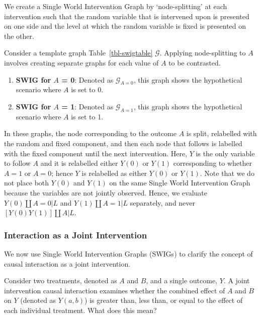 \documentclass[
  single column]{article}
\providecommand{\tightlist}{%
  \setlength{\itemsep}{0pt}\setlength{\parskip}{0pt}}\usepackage{longtable,booktabs,array}
\begin{document}
We create a Single World Intervention Graph by `node-splitting' at each
intervention such that the random variable that is intervened upon is
presented on one side and the level at which the random variable is
fixed is presented on the other.

Consider a template graph Table~\ref{tbl-swigtable} \(\mathcal{G}\).
Applying node-splitting to \(A\) involves creating separate graphs for
each value of \(A\) to be contrasted.

\begin{enumerate}
\def\labelenumi{\arabic{enumi}.}
\tightlist
\item
  \textbf{SWIG for \(A\) = 0}: Denoted as \(\mathcal{G}_{A=0}\), this
  graph shows the hypothetical scenario where \(A\) is set to 0.
\item
  \textbf{SWIG for \(A\) = 1}: Denoted as \(\mathcal{G}_{A=1}\), this
  graph shows the hypothetical scenario where \(A\) is set to 1.
\end{enumerate}

In these graphs, the node corresponding to the outcome \(A\) is split,
relabelled with the random and fixed component, and then each node that
follows is labelled with the fixed component until the next
intervention. Here, \(Y\) is the only variable to follow \(A\) and it is
relabelled either \(Y(0)\) or \(Y(1)\) corresponding to whether \(A=1\)
or \(A=0\); hence \(Y\) is relabelled as either \(Y(0)\) or \(Y(1)\).
Note that we do not place both \(Y(0)\) and \(Y(1)\) on the same Single
World Intervention Graph because the variables are not jointly observed.
Hence, we evaluate \(Y(0)\coprod A = 0| L\) and
\(Y(1)\coprod A = 1 | L\) separately, and never
\([Y(0) Y(1)] \coprod A | L\).

\subsubsection{Interaction as a Joint
Intervention}\label{interaction-as-a-joint-intervention}

We now use Single World Intervention Graphs (SWIGs) to clarify the
concept of causal interaction as a joint intervention.

Consider two treatments, denoted as \(A\) and \(B\), and a single
outcome, \(Y\). A joint intervention causal interaction examines whether
the combined effect of \(A\) and \(B\) on \(Y\) (denoted as \(Y(a,b)\))
is greater than, less than, or equal to the effect of each individual
treatment. What does this mean?
\end{document}
